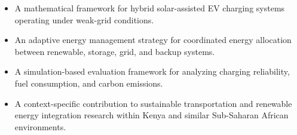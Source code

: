 \begin{itemize}
    \item A mathematical framework for hybrid solar-assisted EV charging systems operating under weak-grid conditions.
    
    \item An adaptive energy management strategy for coordinated energy allocation between renewable, storage, grid, and backup systems.
    
    \item A simulation-based evaluation framework for analyzing charging reliability, fuel consumption, and carbon emissions.
    
    \item A context-specific contribution to sustainable transportation and renewable energy integration research within Kenya and similar Sub-Saharan African environments.
\end{itemize}